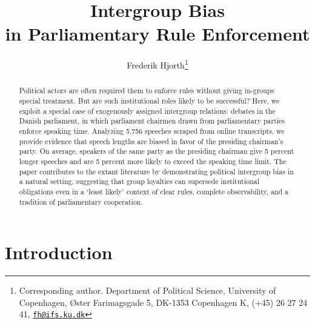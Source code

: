 \documentclass[12pt,a4paper]{article}
\title{ \textbf{Intergroup Bias \\ in Parliamentary Rule Enforcement}  }
\author{Frederik Hjorth\thanks{Corresponding author. Department of Political Science, University of Copenhagen, Øster Farimagsgade 5, DK-1353 Copenhagen K, (+45) 26 27 24 41, \texttt{\href{mailto:fh@ifs.ku.dk}{fh@ifs.ku.dk}}}}
\date{}
\begin{document}
\maketitle




\doublespacing

\begin{abstract}
\noindent Political actors are often required them to enforce rules without giving in-groups special treatment. But are such institutional roles likely to be successful? Here, we exploit a special case of exogenously assigned intergroup relations: debates in the Danish parliament, in which parliament chairmen drawn from parliamentary parties enforce speaking time. Analyzing 5,756 speeches scraped from online transcripts, we provide evidence that speech lengths are biased in favor of the presiding chairman's party. On average, speakers of the same party as the presiding chairman give 5 percent longer speeches and are 5 percent more likely to exceed the speaking time limit. The paper contributes to the extant literature by demonstrating political intergroup bias in a natural setting, suggesting that group loyalties can supersede institutional obligations even in a `least likely' context of clear rules, complete observability, and a tradition of parliamentary cooperation.
\end{abstract}

%



\newpage

\section{Introduction}
\end{document}
